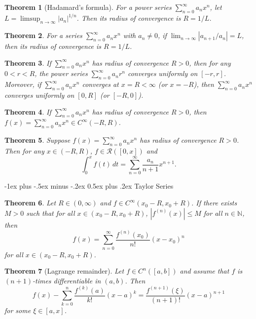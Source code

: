 \documentclass[10pt,landscape]{article}
\makeatletter
\newtheorem{theorem}{Theorem}
\newcommand{\N}{\mathbb{N}}
\renewcommand{\section}{\@startsection{section}{1}{0mm}%
                                {-1ex plus -.5ex minus -.2ex}%
                                {0.5ex plus .2ex}%
                                {\normalfont\large\bfseries}}
\makeatother
\begin{document}
\begin{multicols}{3}
\begin{theorem}[Hadamard's formula]
  For a power series $\sum_{n = 0}^\infty a_n x^n$,
  let $L = \limsup_{n \to \infty} |a_n|^{1 / n}$.
  Then its radius of convergence is $R = 1 / L$.
\end{theorem}

\begin{theorem}
  For a series $\sum_{n = 0}^\infty a_n x^n$ with $a_n \ne 0$,
  if $\lim_{n \to \infty} |a_{n + 1} / a_n| = L$,
  then its radius of convergence is $R = 1 / L$.
\end{theorem}

\begin{theorem}
  If $\sum_{n = 0}^\infty a_n x^n$ has radius of convergence
  $R > 0$, then for any $0 < r < R$, the power
  series $\sum_{n = 0}^\infty a_n r^n$ converges
  uniformly on $[-r, r]$. Moreover, if
  $\sum_{n = 0}^\infty a_n x^n$ converges at
  $x = R < \infty$ (or $x = -R$), then $\sum_{n = 0}^\infty a_n x^n$
  converges uniformly on $[0, R]$ (or $[-R, 0]$).
\end{theorem}

\begin{theorem}
  If $\sum_{n = 0}^\infty a_n x^n$ has radius of
  convergence $R > 0$, then
  $f(x) = \sum_{n = 0}^\infty a_n x^n \in C^\infty(-R, R)$.
\end{theorem}

\begin{theorem}
  Suppose $f(x) = \sum_{n = 0}^\infty a_n x^n$ has
  radius of convergence $R > 0$. Then for any
  $x \in (-R, R)$, $f \in \mathcal{R}([0, x])$
  and
  \[
    \int_0^x f(t)\, dt = \sum_{n = 0}^\infty \frac{a_n}{n + 1} x^{n + 1}.
  \]
\end{theorem}

\section{Taylor Series}
\begin{theorem}
   Let $R \in (0, \infty)$ and
   $f \in C^\infty(x_0 - R, x_0 + R)$. If there
   exists $M > 0$ such that for all $x \in (x_0 - R, x_0 + R)$,
   $|f^{(n)}(x)| \le M$ for all $n \in \N$, then
   \[
     f(x) = \sum_{n = 0}^\infty \frac{f^{(n)}(x_0)}{n!} (x - x_0)^n
   \]
   for all $x \in (x_0 - R, x_0 + R)$.
\end{theorem}

\begin{theorem}[Lagrange remainder]
  Let $f \in C^n([a, b])$ and assume that
  $f$ is $(n + 1)$-times differentiable in $(a, b)$. Then
  \[
    f(x) - \sum_{k = 0}^n \frac{f^{(k)}(a)}{k!} (x - a)^k
    = \frac{f^{(n + 1)}(\xi)}{(n + 1)!} (x - a)^{n + 1}
  \]
  for some $\xi \in [a, x]$.
\end{theorem}


\end{multicols}
\end{document}
